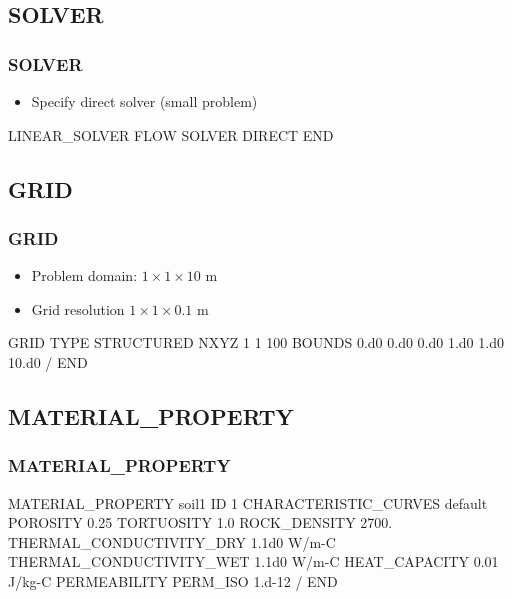 \documentclass{beamer}
\begin{document}
\subsection{SOLVER}
\begin{frame}[fragile]\frametitle{SOLVER}

\begin{itemize}
  \item Specify direct solver (small problem)
\end{itemize}

\begin{semiverbatim}
LINEAR_SOLVER FLOW
  SOLVER DIRECT
END
\end{semiverbatim}
\end{frame}
\subsection{GRID}
\begin{frame}\frametitle{GRID}

\begin{itemize}
  \item Problem domain: $1 \times 1 \times 10$ m
  \item Grid resolution $1 \times 1 \times 0.1$ m
\end{itemize}

\begin{semiverbatim}
GRID
  TYPE STRUCTURED
  NXYZ 1 1 100
  BOUNDS
    0.d0 0.d0 0.d0
    1.d0 1.d0 10.d0
  /
END
\end{semiverbatim}

\end{frame}
\subsection{MATERIAL\_PROPERTY}

\begin{frame}\frametitle{MATERIAL\_PROPERTY}

\begin{semiverbatim}
MATERIAL_PROPERTY soil1
  ID 1
  CHARACTERISTIC_CURVES default
  POROSITY 0.25
  TORTUOSITY 1.0
  ROCK_DENSITY 2700.
  THERMAL_CONDUCTIVITY_DRY 1.1d0 W/m-C
  THERMAL_CONDUCTIVITY_WET 1.1d0 W/m-C
  HEAT_CAPACITY 0.01 J/kg-C
  PERMEABILITY
    PERM_ISO 1.d-12 
  /
END
\end{semiverbatim}

\end{frame}
\end{document}
